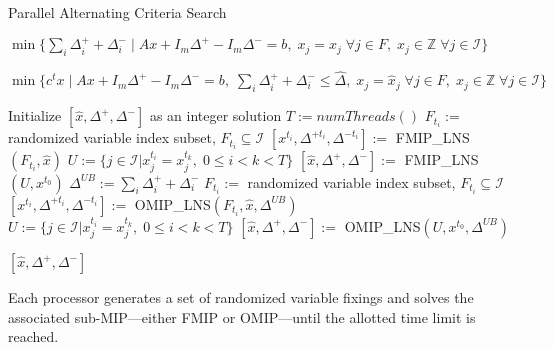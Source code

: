\begin{algorithm}[h]
\caption{Parallel Alternating Criteria Search}\label{alg:PACS}
\begin{algorithmic}
    \State \Return $\min\{\sum_i \Delta^+_i + \Delta^-_i \mid A x + I_m \Delta^+ - I_m \Delta^- = b, \; x_j = \hat{x}_j \; \forall j \in F, \; x_j \in \mathbb{Z} \; \forall j \in \mathcal{I}\}$
\EndFunction
\end{algorithmic}
\vspace{1em}
\begin{algorithmic}
    \State \Return $\min\{c^t x \mid A x + I_m \Delta^+ - I_m \Delta^- = b, \; \sum_i \Delta^+_i + \Delta^-_i \leq \hat{\Delta}, \; x_j = \hat{x}_j \; \forall j \in F, \; x_j \in \mathbb{Z} \; \forall j \in \mathcal{I}\}$
\EndFunction
\end{algorithmic}
\vspace{1em}
\begin{algorithmic}[1]
\State Initialize $[\hat{x}, \Delta^+, \Delta^-]$ as an integer solution
\State $T := numThreads()$
            \State $F_{t_i} :=$ randomized variable index subset, $F_{t_i} \subseteq \mathcal{I}$ 
            \State $[x^{t_i}, \Delta^{+t_i}, \Delta^{-t_i}] :=$ FMIP\_LNS$(F_{t_i}, \hat{x})$
        \EndFor
        \State $U := \{ j \in \mathcal{I} | x^{t_i}_j = x^{t_k}_j, \; 0 \leq i < k < T\}$
        \State $[\hat{x}, \Delta^+, \Delta^-] :=$ FMIP\_LNS$(U, x^{t_0})$
    \EndIf
    \State $\Delta^{UB} := \sum_i \Delta^+_i + \Delta^-_i$
            \State $F_{t_i} :=$ randomized variable index subset, $F_{t_i} \subseteq \mathcal{I}$
            \State $[x^{t_i}, \Delta^{+t_i}, \Delta^{-t_i}] :=$ OMIP\_LNS$(F_{t_i}, \hat{x}, \Delta^{UB})$
    \EndFor
    \State $U := \{ j \in \mathcal{I} | x^{t_i}_j = x^{t_k}_j, \; 0 \leq i < k < T\}$
    \State $[\hat{x}, \Delta^+, \Delta^-] :=$ OMIP\_LNS$(U, x^{t_0}, \Delta^{UB})$
    
\EndWhile
\State \Return $[\hat{x}, \Delta^+, \Delta^-]$
\end{algorithmic}
\end{algorithm}
Each processor generates a set of randomized variable fixings and solves the associated sub-MIP—either FMIP or OMIP—until the allotted time limit is reached.
